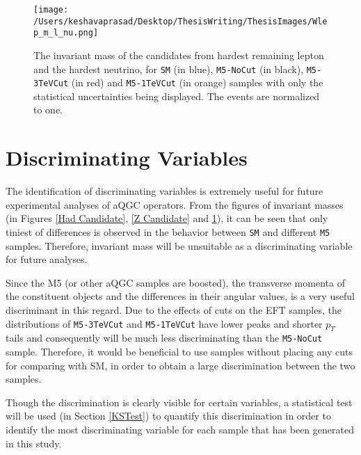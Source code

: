 \begin{figure}[!htb]%
	\centering
	\texttt{[image: /Users/keshavaprasad/Desktop/ThesisWriting/ThesisImages/Wlep\_m\_l\_nu.png]}
	\caption{The invariant mass of the candidates from hardest remaining lepton and the hardest neutrino, for \texttt{SM} (in blue), \texttt{M5-NoCut} (in black), \texttt{M5-3TeVCut} (in red) and \texttt{M5-1TeVCut} (in orange) samples with only the statistical uncertainties being displayed. The events are normalized to one.}
	\label{Lep Candidate}
\end{figure}

\section{Discriminating Variables }\label{Discriminating Variables}
The identification of discriminating variables is extremely useful for future experimental analyses of aQGC operators. From the figures of invariant masses (in Figures \ref{Had Candidate}, \ref{Z Candidate} and \ref{Lep Candidate}), it can be seen that only tiniest of differences is observed in the behavior between \texttt{SM} and different \texttt{M5} samples. Therefore, invariant mass will be unsuitable as a discriminating variable for future analyses. 

Since the M5 (or other aQGC samples are boosted), the transverse momenta of the constituent objects and the differences in their angular values, is a very useful discriminant in this regard. Due to the effects of cuts on the EFT samples, the distributions of \texttt{M5-3TeVCut} and \texttt{M5-1TeVCut} have lower peaks and shorter $p_{T}$ tails and consequently will be much less discriminating than the \texttt{M5-NoCut} sample. Therefore, it would be beneficial to use samples without placing any cuts for comparing with SM, in order to obtain a large discrimination between the two samples. 

Though the discrimination is clearly visible for certain variables, a statistical test will be used (in Section \ref{KSTest}) to quantify this discrimination in order to identify the most discriminating variable for each sample that has been generated in this study.

